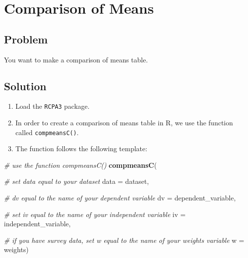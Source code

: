 \documentclass[
]{book}
\newenvironment{Shaded}{\begin{snugshade}}{\end{snugshade}}
\newcommand{\AttributeTok}[1]{\textcolor[rgb]{0.13,0.29,0.53}{#1}}
\newcommand{\CommentTok}[1]{\textcolor[rgb]{0.56,0.35,0.01}{\textit{#1}}}
\newcommand{\FunctionTok}[1]{\textcolor[rgb]{0.13,0.29,0.53}{\textbf{#1}}}
\newcommand{\NormalTok}[1]{#1}
\providecommand{\tightlist}{%
  \setlength{\itemsep}{0pt}\setlength{\parskip}{0pt}}
\begin{document}
\hypertarget{compmeans}{%
\section{Comparison of Means}\label{compmeans}}

\hypertarget{problem-41}{%
\subsection{Problem}\label{problem-41}}

You want to make a comparison of means table.

\hypertarget{solution-40}{%
\subsection{Solution}\label{solution-40}}

\begin{enumerate}
\def\labelenumi{\arabic{enumi}.}
\tightlist
\item
  Load the \texttt{RCPA3} package.
\item
  In order to create a comparison of means table in R, we use the function called \texttt{compmeansC()}.\\
\item
  The function follows the following template:
\end{enumerate}

\begin{Shaded}
\begin{Highlighting}[]
\CommentTok{\# use the function \textasciigrave{}compmeansC()}
\FunctionTok{compmeansC}\NormalTok{(}
  
  \CommentTok{\# set \textasciigrave{}data\textasciigrave{} equal to your dataset}
  \AttributeTok{data =}\NormalTok{ dataset,}
  
  \CommentTok{\# \textasciigrave{}dv\textasciigrave{} equal to the name of your dependent variable}
  \AttributeTok{dv =}\NormalTok{ dependent\_variable, }
  
  \CommentTok{\# set \textasciigrave{}iv\textasciigrave{} equal to the name of your independent variable}
  \AttributeTok{iv =}\NormalTok{ independent\_variable, }
  
  \CommentTok{\# if you have survey data, set \textasciigrave{}w\textasciigrave{} equal to the name of your weights variable}
  \AttributeTok{w =}\NormalTok{ weights)}
\end{Highlighting}
\end{Shaded}
\end{document}
